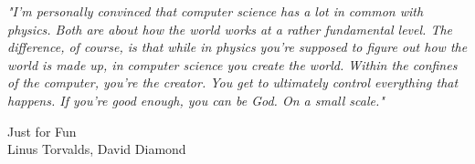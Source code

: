 \epigraph{{\em "I'm personally convinced that computer science has a lot in common with physics. Both are about how the world works at a rather fundamental level. The difference, of course, is that while in physics you're supposed to figure out how the world is made up, in computer science you create the world. Within the confines of the computer, you're the creator. You get to ultimately control everything that happens. If you're good enough, you can be God. On a small scale."}}{Just for Fun\\Linus Torvalds, David Diamond} 

